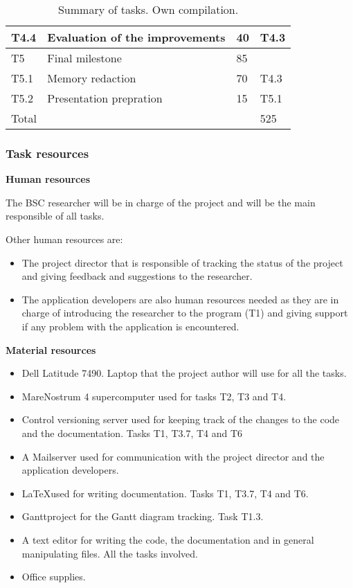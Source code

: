 \begin{table}[htbp]
\begin{tabular}{llll}
T4.4 & Evaluation of the improvements                   & 40       & T4.3         \\ \hline
T5   & Final milestone                                  & 85       &              \\ \hline
T5.1 & Memory redaction                                 & 70       & T4.3         \\
T5.2 & Presentation prepration                          & 15       & T5.1         \\ \hline
\multicolumn{3}{l}{Total}                                          & 525         
\end{tabular}
\caption[Summary of tasks]{Summary of tasks. Own compilation.}
\label{tab:tasks}
\end{table}

\subsubsection{Task resources}

\textbf{Human resources}

The BSC researcher will be in charge of the project and will be the main responsible of all tasks.

Other human resources are:
\begin{itemize}
  \item The project director that is responsible of tracking the status of the project and giving feedback and suggestions to the researcher.
  \item The application developers are also human resources needed as they are in charge of introducing the researcher to the program (T1) and giving support if any problem with the application is encountered.
\end{itemize}

\noindent
\textbf{Material resources}

\begin{itemize}
  \item Dell Latitude 7490. Laptop that the project author will use for all the tasks.
  \item MareNostrum 4 supercomputer used for tasks T2, T3 and T4.
  \item Control versioning server used for keeping track of the changes to the code and the documentation. Tasks T1, T3.7, T4 and T6
  \item A Mailserver used for communication with the project director and the application developers.
  \item \LaTeX used for writing documentation. Tasks T1, T3.7, T4 and T6.
  \item Ganttproject for the Gantt diagram tracking. Task T1.3.
  \item A text editor for writing the code, the documentation and in general manipulating files. All the tasks involved.
  \item Office supplies.
\end{itemize}
